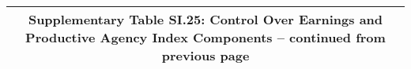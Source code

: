 \begin{longtable}{llcccccccccc}
\multicolumn{12}{c}{{\bfseries Supplementary Table SI.25: Control Over Earnings and Productive Agency Index Components -- continued from previous page}} \\ \hline                                                                                                                                                                                                                                                                                                                                                                                                                                                                                                                                                                                                                                                                                                                        

\end{longtable}
